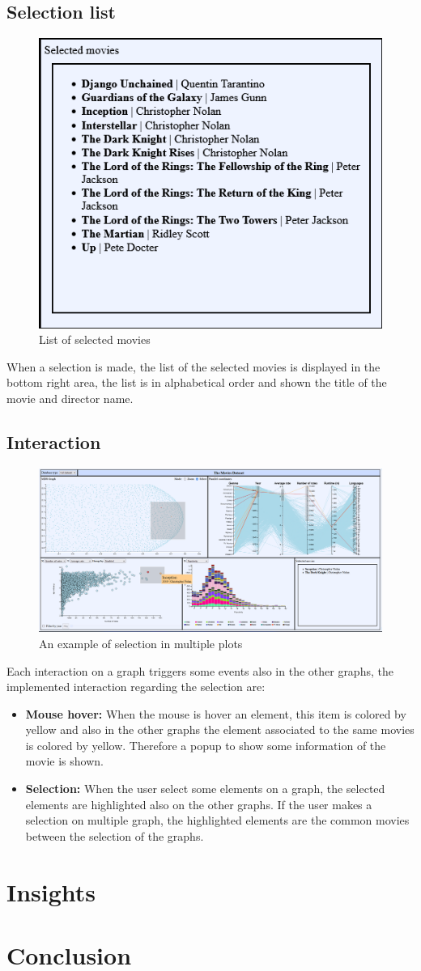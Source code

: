 \documentclass[]{article}
\begin{document}
\subsection{Selection list}
\begin{figure}[H]
	\centering
	\includegraphics[width=0.7\linewidth]{images/selection_list}
	\caption[Selection list]{List of selected movies}
	\label{fig:selectionlist}
\end{figure}
When a selection is made, the list of the selected movies is displayed in the bottom right area, the list is in alphabetical order and shown the title of the movie and director name.
\subsection{Interaction}
\begin{figure}[H]
	\centering
	\includegraphics[width=1\linewidth]{images/interaction1}
	\caption[Interaction example]{An example of selection in multiple plots}
	\label{fig:interaction1}
\end{figure}
Each interaction on a graph triggers some events also in the other graphs, the implemented interaction regarding the selection are:
\begin{itemize}
	\item \textbf{Mouse hover:} When the mouse is hover an element, this item is colored by yellow and also in the other graphs the element associated to the same movies is colored by yellow. Therefore a popup to show some information of the movie is shown.
	\item \textbf{Selection:} When the user select some elements on a graph, the selected elements are highlighted also on the other graphs. If the user makes a selection on multiple graph, the highlighted elements are the common movies between the selection of the graphs.
\end{itemize}
\section{Insights}
\section{Conclusion}
\end{document}
